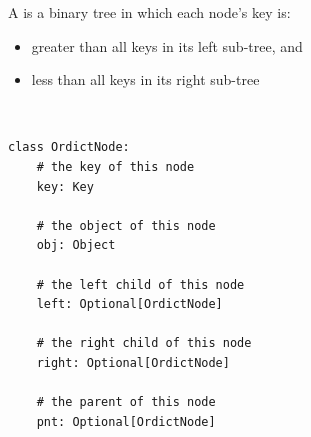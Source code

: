 \documentclass[mathserif, handout]{beamer}
\begin{document}
\begin{frame}
\begin{thmbox}
A  is a binary tree in which each node's key is:
\begin{itemize}
\item greater than all keys in its left sub-tree, and
\item less than all keys in its right sub-tree
\end{itemize}
\begin{center}
\end{center}
\end{thmbox}

\end{frame}

\begin{frame}[fragile]
\vspace{-7mm}
\begin{thmboxtop}
 \\
\begin{lstlisting}[style=mypython]
class OrdictNode:
    # the key of this node
    key: Key
    
    # the object of this node
    obj: Object

    # the left child of this node
    left: Optional[OrdictNode]

    # the right child of this node
    right: Optional[OrdictNode]

    # the parent of this node
    pnt: Optional[OrdictNode]
\end{lstlisting}
\end{thmboxtop}
\end{frame}
\end{document}
